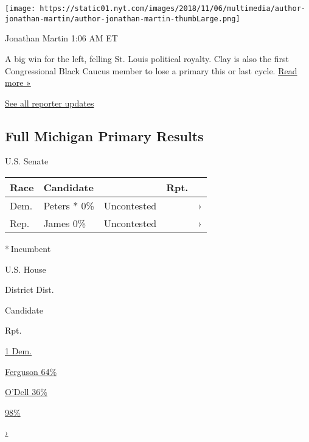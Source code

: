 \texttt{[image: https://static01.nyt.com/images/2018/11/06/multimedia/author-jonathan-martin/author-jonathan-martin-thumbLarge.png]}

Jonathan Martin 1:06 AM ET

A big win for the left, felling St. Louis political royalty. Clay is
also the first Congressional Black Caucus member to lose a primary this
or last cycle.
\href{https://www.nytimes.com/2020/08/05/us/politics/cori-bush-missouri-william-lacy-clay.html?action=click\&module=ELEX_results\&pgtype=Interactive\&region=ReporterUpdates}{Read
more »}

\href{https://www.nytimes.com/interactive/2020/08/04/us/elections/live-analysis-arizona-kansas-michigan-missouri-primaries.html?action=click\&module=ELEX_results\&pgtype=Interactive\&region=Component}{See
all reporter updates}

\hypertarget{full-michigan-primary-results}{%
\subsection{Full Michigan Primary
Results}\label{full-michigan-primary-results}}

U.S. Senate

\begin{longtable}[]{@{}lllll@{}}
\toprule
Race & Candidate & & Rpt. &\tabularnewline
\midrule
\endhead
Dem. & Peters * 0\% & Uncontested & & ›\tabularnewline
Rep. & James 0\% & Uncontested & & ›\tabularnewline
\bottomrule
\end{longtable}

* Incumbent~

U.S. House

District Dist.

Candidate

Rpt.

\href{https://www.nytimes.com/interactive/2020/08/04/us/elections/results-michigan-house-district-1-primary-election.html}{1
Dem.}

\href{https://www.nytimes.com/interactive/2020/08/04/us/elections/results-michigan-house-district-1-primary-election.html}{
Ferguson 64\% }

\href{https://www.nytimes.com/interactive/2020/08/04/us/elections/results-michigan-house-district-1-primary-election.html}{
O'Dell 36\% }

\href{https://www.nytimes.com/interactive/2020/08/04/us/elections/results-michigan-house-district-1-primary-election.html}{98\%}

\href{https://www.nytimes.com/interactive/2020/08/04/us/elections/results-michigan-house-district-1-primary-election.html}{›}

